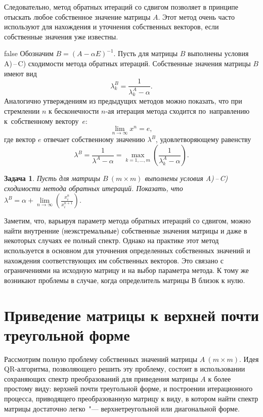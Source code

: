 \documentclass[11pt,a4paper,twoside,listtotoc,bibtotoc]{report}
\numberwithin{equation}{section}
\newtheorem*{problem}{Задача}
\theoremstyle{definition}
\theoremstyle{plain}
\begin{document}
Следовательно, метод обратных итераций со сдвигом позволяет в принципе
отыскать любое собственное значение матрицы $A$. Этот метод очень часто
используют для нахождения и уточнения собственных векторов, если собственные
значения уже известны.

\ifx false
Обозначим $B=(A-\alpha E)^{-1}$.
Пусть для матрицы $B$ выполнены условия A)\,--\,C) сходимости метода
обратных итераций. Собственные значения матрицы $B$ имеют вид
%
$$
    \lambda_k^B=\frac{1}{\lambda_k^A-\alpha}.
$$
%
Аналогично утверждениям из предыдущих методов можно показать, что
при стремлении $n$ к бесконечности $n$-ая итерация метода сходится
по~направлению к~собственному вектору~$e$:
%
$$
     \lim_{n\to\infty}x^n=e,
$$
%
где вектор $e$ отвечает собственному значению $\lambda^B$, удовлетворяющему равенству
%
$$
    \lambda^B=\frac{1}{\lambda^A-\alpha} = \underset{k=1,\ldots,m}
    \max{\left(\frac{1}{\lambda_k^A-\alpha}\right)}.
$$
%
%
\begin{problem}
    Пусть для матрицы $B~(m \times m)$ выполнены
    условия A)\,--\,C) сходимости метода обратных итераций.
    Показать, что
    $\lambda^B =\alpha +
        \underset{n\to\infty}\lim\left(\frac{x^n_i}{x^{n+1}_i}\right)$.
\end{problem}
%


Заметим, что, варьируя параметр метода обратных итераций со сдвигом,
можно найти внутренние (неэкстремальные) собственные значения матрицы и даже
в некоторых случаях ее полный спектр. Однако на практике этот метод используется
в основном для уточнения определенных собственных значений и нахождения соответствующих
им собственных векторов. Это связано с ограничениями на исходную матрицу и
на выбор параметра метода. К тому же возникают проблемы в случае,
когда определитель матрицы $В$ близок к нулю.
\fi
%
\section{Приведение матрицы к верхней почти треугольной форме}
%
Рассмотрим полную проблему собственных значений матрицы $A~(m \times m)$.
Идея QR-алгоритма, позволяющего решить эту проблему, состоит в использовании
сохраняющих спектр преобразований для приведения матрицы $A$ к
более простому виду: верхней почти треугольной форме, и построении
итерационного процесса, приводящего преобразованную матрицу к виду,
в котором найти спектр матрицы достаточно легко~"---
верхнетреугольной или диагональной форме.
\end{document}
